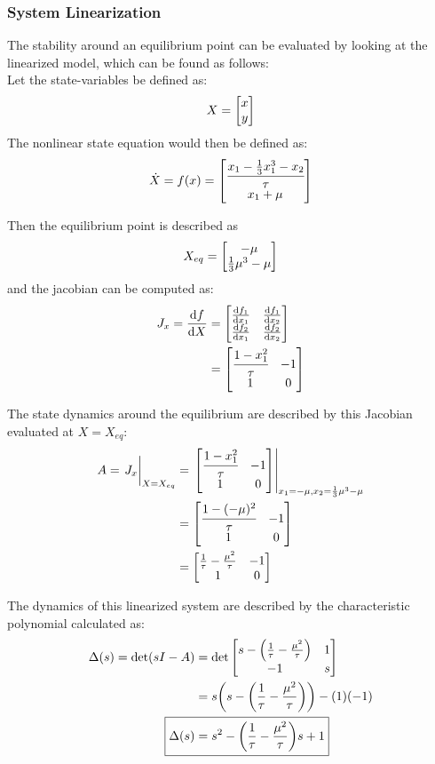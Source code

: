 \documentclass[letter]{article}
\numberwithin{equation}{section}
\begin{document}
\newpage
\subsubsection{System Linearization}
The stability around an equilibrium point can be evaluated by looking at the linearized model, which can be found as follows:\\

Let the state-variables be defined as:
$$X = \mqty[x\\ y]$$
The nonlinear state equation would then be defined as:
\begin{equation}
	\dot{X} = f(x) 
	= \mqty[\cfrac{x_1 - \frac{1}{3} x_1^3 - x_2}{\tau}\\
			x_1 + \mu]
\end{equation}

Then the equilibrium point is described as
$$X_{eq} = \mqty[-\mu\\ \frac{1}{3} \mu^3 - \mu]$$
and the jacobian can be computed as:
\begin{align}
	J_x = \dv{f}{X} &= \mqty[\dv{f_1}{x_1} &\dv{f_1}{x_2}\\ \dv{f_2}{x_1} & \dv{f_2}{x_2}]\\
	&= \mqty[\cfrac{1 - x_1^2}{\tau} & -1\\
			 1 & 0]
\end{align}

The state dynamics around the equilibrium are described by this Jacobian evaluated at $X = X_{eq}$:
\begin{align}
	A = \eval{J_x}_{X = X_{eq}}
	&= \eval{\mqty[\cfrac{1 - x_1^2}{\tau} & -1\\ 1 & 0]}_{x_1 = -\mu, x_2 = \frac{1}{3} \mu^3 - \mu}\\
	&= \mqty[\cfrac{1 - (-\mu)^2}{\tau} & -1\\ 1 & 0]\\
	&= \mqty[\frac{1}{\tau} - \frac{\mu^2}{\tau} &-1\\ 1 &0]
\end{align}

The dynamics of this linearized system are described by the characteristic polynomial calculated as:
\begin{align}
	\Delta(s) = \det(sI - A)
	&= \det\mqty[s-\qty(\frac{1}{\tau} - \frac{\mu^2}{\tau}) &1\\ -1 &s]\\
	&= s \qty(s-\qty(\frac{1}{\tau} - \frac{\mu^2}{\tau})) - (1)(-1)\\
	\Aboxed{\Delta(s) &= s^2 - \qty(\frac{1}{\tau} - \frac{\mu^2}{\tau}) s + 1}
\end{align}
\end{document}
